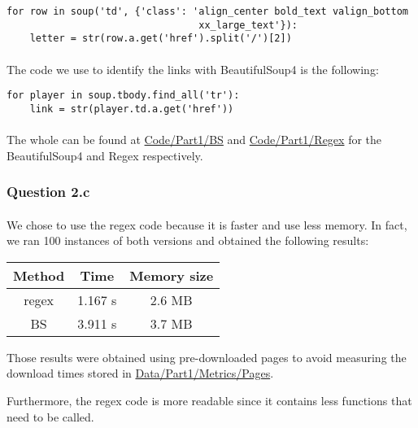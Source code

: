 \begin{verbatim}
for row in soup('td', {'class': 'align_center bold_text valign_bottom
								 xx_large_text'}):
	letter = str(row.a.get('href').split('/')[2])
\end{verbatim}

\paragraph{}The code we use to identify the links with BeautifulSoup4 is the following:

\begin{verbatim}
for player in soup.tbody.find_all('tr'):
	link = str(player.td.a.get('href'))
\end{verbatim}

\paragraph{}The whole can be found at \url{Code/Part1/BS} and \url{Code/Part1/Regex} for the BeautifulSoup4 and Regex respectively.

\subsubsection{Question 2.c}
\label{subsubsec:312c}
\paragraph{} We chose to use the regex code because it is faster and use less memory. In fact, we ran 100 instances of both versions and obtained the following results:
\begin{center}
	\begin{tabular}{| c | c | c |}
	\hline
	Method & Time & Memory size \\ \hline
	regex 	& 1.167 s & 2.6 MB \\ \hline
	BS & 3.911 s & 3.7 MB \\
	\hline
	\end{tabular}
\end{center}

Those results were obtained using pre-downloaded pages to avoid measuring the download times stored in \url{Data/Part1/Metrics/Pages}.

Furthermore, the regex code is more readable since it contains less functions that need to be called.
